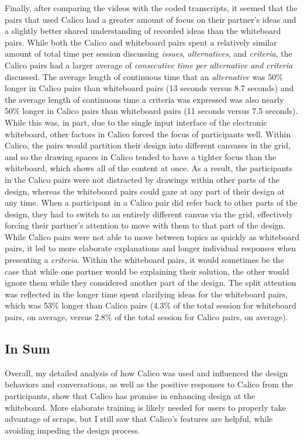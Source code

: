 Finally, after comparing the videos with the coded transcripts, it seemed that the pairs that used Calico had a greater amount of focus on their partner's ideas and a slightly better shared understanding of recorded ideas than the whiteboard pairs. While both the Calico and whiteboard pairs spent a relatively similar amount of total time per session discussing \emph{issues}, \emph{alternatives}, and \emph{criteria}, the Calico pairs had a larger average of \emph{consecutive time per alternative and criteria} discussed. The average length of continuous time that an \emph{alternative} was 50\% longer in Calico pairs than whiteboard pairs (13 seconds versus 8.7 seconds) and the average length of continuous time a criteria was expressed was also nearly 50\% longer in Calico pairs than whiteboard pairs (11 seconds versus 7.5 seconds). While this was, in part, due to the single input interface of the electronic whiteboard, other factors in Calico forced the focus of participants well. Within Calico, the pairs would partition their design into different canvases in the grid, and so the drawing spaces in Calico tended to have a tighter focus than the whiteboard, which shows all of the content at once. As a result, the participants in the Calico pairs were not distracted by drawings within other parts of the design, whereas the whiteboard pairs could gaze at any part of their design at any time. When a participant in a Calico pair did refer back to other parts of the design, they had to switch to an entirely different canvas via the grid, effectively forcing their partner's attention to move with them to that part of the design. While Calico pairs were not able to move between topics as quickly as whiteboard pairs, it led to more elaborate explanations and longer individual responses when presenting a \emph{criteria}. Within the whiteboard pairs, it would sometimes be the case that while one partner would be explaining their solution, the other would ignore them while they considered another part of the design. The split attention was reflected in the longer time spent clarifying ideas for the whiteboard pairs, which was 53\% longer than Calico pairs (4.3\% of the total session for whiteboard pairs, on average, versus 2.8\% of the total session for Calico pairs, on average). 

\subsection {In Sum}
\label{discussion:6}

Overall, my detailed analysis of how Calico was used and influenced the design behaviors and conversations, as well as the positive responses to Calico from the participants, show that Calico has promise in enhancing design at the whiteboard. More elaborate training is likely needed for users to properly take advantage of scraps, but I still saw that Calico's features are helpful, while avoiding impeding the design process. 

